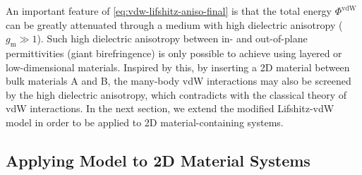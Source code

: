 An important feature of \autoref{eq:vdw-lifshitz-aniso-final} is that
the total energy $\Phi^{\mathrm{vdW}}$ can be greatly attenuated
through a medium with high dielectric anisotropy (\ie
$g_{\mathrm{m}} \gg 1$).
%
Such high dielectric anisotropy between in- and out-of-plane
permittivities (giant birefringence) is only possible to achieve using
layered \cite{Collin_1958_aniso,Weber_2000_aniso} or low-dimensional
\cite{Niu_2018_aniso,Segura_2018_aniso} materials. Inspired by this,
by inserting a 2D material between bulk materials A and B, the
many-body  vdW interactions may also be
screened by the high dielectric anisotropy, which contradicts with the classical theory of vdW interactions. 
%
In the next section, we extend the modified Lifshitz-vdW model in
order to be applied to 2D material-containing systems.


\subsection{Applying Model to 2D Material Systems}
\label{sec:vdw-model-2D}

